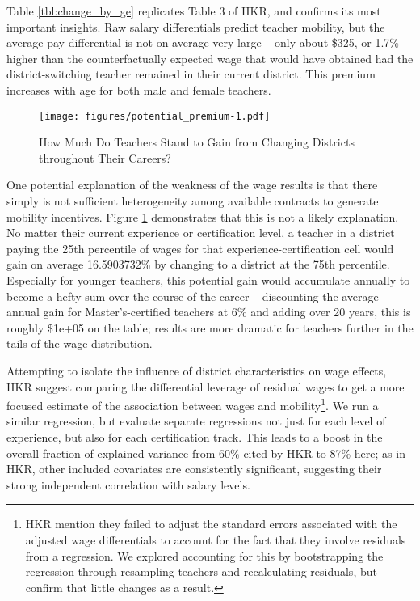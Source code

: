 Table \ref{tbl:change_by_ge} replicates Table 3 of HKR, and confirms its
most important insights. Raw salary differentials predict teacher
mobility, but the average pay differential is not on average very large
-- only about \$325, or 1.7\% higher than the counterfactually expected
wage that would have obtained had the district-switching teacher
remained in their current district. This premium increases with age for
both male and female teachers.

\begin{figure}[htbp]
\centering
\texttt{[image: figures/potential\_premium-1.pdf]}
\caption{\label{fig:premia}How Much Do Teachers Stand to Gain from
Changing Districts throughout Their Careers?}
\end{figure}

One potential explanation of the weakness of the wage results is that
there simply is not sufficient heterogeneity among available contracts
to generate mobility incentives. Figure \ref{fig:premia} demonstrates
that this is not a likely explanation. No matter their current
experience or certification level, a teacher in a district paying the
25th percentile of wages for that experience-certification cell would
gain on average 16.5903732\% by changing to a district at the 75th
percentile. Especially for younger teachers, this potential gain would
accumulate annually to become a hefty sum over the course of the career
-- discounting the average annual gain for Master's-certified teachers
at 6\% and adding over 20 years, this is roughly \$1e+05 on the table;
results are more dramatic for teachers further in the tails of the wage
distribution.

Attempting to isolate the influence of district characteristics on wage
effects, HKR suggest comparing the differential leverage of residual
wages to get a more focused estimate of the association between wages
and mobility\footnote{HKR mention they failed to adjust the standard
  errors associated with the adjusted wage differentials to account for
  the fact that they involve residuals from a regression. We explored
  accounting for this by bootstrapping the regression through resampling
  teachers and recalculating residuals, but confirm that little changes
  as a result.}. We run a similar regression, but evaluate separate
regressions not just for each level of experience, but also for each
certification track. This leads to a boost in the overall fraction of
explained variance from 60\% cited by HKR to 87\% here; as in HKR, other
included covariates are consistently significant, suggesting their
strong independent correlation with salary levels.

